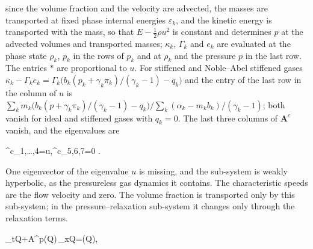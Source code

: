 since the volume fraction and the velocity are advected, the masses are transported at fixed phase internal energies
$\varepsilon_k$, and the kinetic energy is transported with the mass, so that $E-\tfrac12\rho u^2$ is constant and determines $p$ at the
advected volumes and transported masses; $\kappa_k$, $\Gamma_k$ and $e_k$ are evaluated at the phase state $\rho_k$, $p_k$ in the rows of $p_k$
and at $\rho_k$ and the pressure $p$ in the last row. The entries $\ast$ are proportional to $u$. For stiffened and Noble--Abel stiffened gases $\kappa_k-\Gamma_ke_k=\Gamma_k\big(b_k(p_k+\gamma_k\pi_k)/(\gamma_k-1)-q_k\big)$ and
the entry of the last row in the column of $u$ is $\sum_km_k\big(b_k(p+\gamma_k\pi_k)/(\gamma_k-1)-q_k\big)\big/\sum_k(\alpha_k-m_kb_k)/(\gamma_k-1)$; both vanish for ideal and stiffened gases
with $q_k=0$. The last three columns of $\mathbf A^c$ vanish, and the eigenvalues are

\lambda^c_{1,\dots,4}=u,\qquad \lambda^c_{5,6,7}=0 .

One eigenvector of the eigenvalue $u$ is missing, and the sub-system is weakly hyperbolic, as the pressureless gas dynamics it contains.
The characteristic speeds are the flow velocity and zero. The volume fraction is transported only by this sub-system; in
the pressure--relaxation sub-system it changes only through the relaxation terms.

\partial_t\mathbf Q+\mathbf A^p(\mathbf Q)\,\partial_x\mathbf Q=(\mathbf Q),\\

